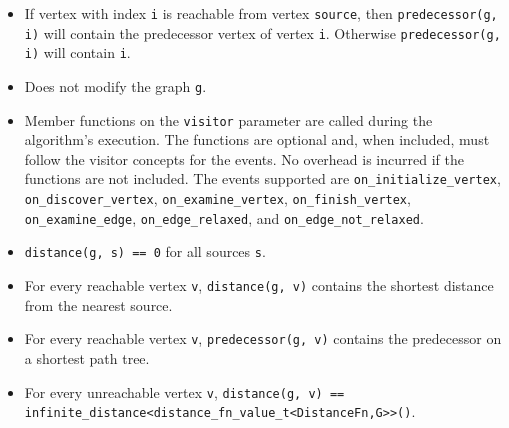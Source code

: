 \begin{itemdescr}
\begin{itemize}
                        If vertex with index \lstinline{i} is reachable from vertex \lstinline{source}, then
                        \lstinline{distance(g, i)} will contain the distance from \lstinline{source} to vertex
                        \lstinline{i}.  Otherwise \lstinline{distance(g, i)} will contain
                        \lstinline{infinite_distance()}.
                  \item
                        If vertex with index \lstinline{i} is reachable
                        from vertex \lstinline{source}, then \lstinline{predecessor(g, i)} will contain the
                        predecessor vertex of vertex \lstinline{i}. Otherwise \lstinline{predecessor(g, i)} will contain
                        \lstinline{i}.
                  \item Does not modify the graph \lstinline{g}.
                  \item Member functions on the \lstinline{visitor} parameter are called during the algorithm's execution.
                        The functions are optional and, when included, must follow the visitor concepts for the events.
                        No overhead is incurred if the functions are not included.
                        The events supported are \lstinline{on_initialize_vertex}, \lstinline{on_discover_vertex},
                        \lstinline{on_examine_vertex}, \lstinline{on_finish_vertex}, \lstinline{on_examine_edge},
                        \lstinline{on_edge_relaxed}, and \lstinline{on_edge_not_relaxed}.
            \end{itemize}
      \pnum\postconditions
            \begin{itemize}
                  \item \lstinline{distance(g, s) == 0} for all sources \lstinline{s}.
                  \item For every reachable vertex \lstinline{v}, \lstinline{distance(g, v)} contains the
                        shortest distance from the nearest source.
                  \item For every reachable vertex \lstinline{v}, \lstinline{predecessor(g, v)} contains the
                        predecessor on a shortest path tree.
                  \item For every unreachable vertex \lstinline{v},
                        \lstinline{distance(g, v) == infinite_distance<distance_fn_value_t<DistanceFn,G>>()}.
            \end{itemize}

\end{itemdescr}
